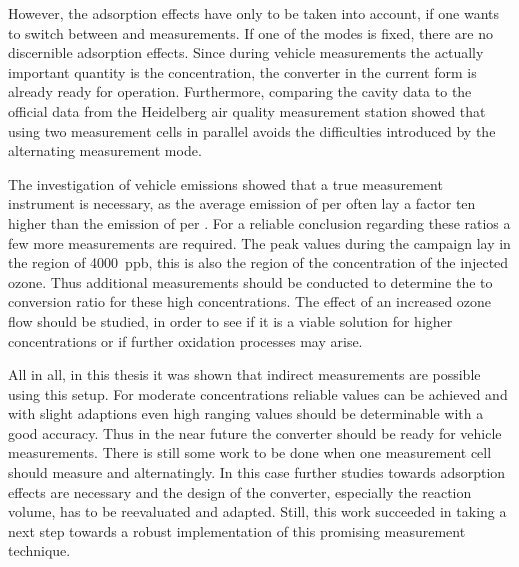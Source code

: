 However, the adsorption effects have only to be taken into account, if
one wants to switch between  and  measurements. If
one of the modes is fixed, there are no discernible
adsorption effects. Since during vehicle measurements the actually
important quantity is the  concentration, the converter in
the current form is already ready for operation. Furthermore,
comparing the cavity data to the official data from the Heidelberg air
quality measurement station showed that using two measurement cells in
parallel avoids the difficulties introduced by the alternating
measurement mode.

The investigation of vehicle emissions showed that a true 
measurement instrument is necessary, as the average emission of
 per  often lay a factor ten higher than the emission
of  per . For a reliable conclusion regarding these
ratios a few more measurements are required. The peak  values
during the campaign lay in the region of \SI{4000}{ppb}, this is also
the region of the concentration of the injected ozone. Thus additional
measurements should be conducted to determine the  to 
conversion ratio for these high concentrations. The effect of an
increased ozone flow should be studied, in order to see if it is a
viable solution for higher concentrations or if further oxidation
processes may arise.

All in all, in this thesis it was shown that indirect 
measurements are possible using this setup. For moderate
concentrations reliable  values can be achieved and with
slight adaptions even high ranging  values should be
determinable with a good accuracy. Thus in the near future the
converter should be ready for  vehicle measurements. There is
still some work to be done when one measurement cell should measure
 and  alternatingly. In this case further studies
towards adsorption effects are necessary and the design of the
converter, especially the reaction volume, has to be reevaluated and
adapted. Still, this work succeeded in taking a next step towards a
robust implementation of this promising measurement technique.

